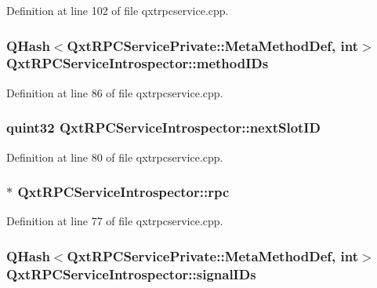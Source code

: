 Definition at line 102 of file qxtrpcservice.\-cpp.

\hypertarget{class_qxt_r_p_c_service_introspector_a5731d54f234700595b57a94949f50ba8}{
\subsubsection[{method\-I\-Ds}]{\setlength{\rightskip}{0pt plus 5cm}Q\-Hash$<${\bf Qxt\-R\-P\-C\-Service\-Private\-::\-Meta\-Method\-Def}, {\bf int}$>$ Qxt\-R\-P\-C\-Service\-Introspector\-::method\-I\-Ds}}\label{class_qxt_r_p_c_service_introspector_a5731d54f234700595b57a94949f50ba8}


Definition at line 86 of file qxtrpcservice.\-cpp.

\hypertarget{class_qxt_r_p_c_service_introspector_aa44ab8688af8058365bc75876c78fb22}{
\subsubsection[{next\-Slot\-I\-D}]{\setlength{\rightskip}{0pt plus 5cm}quint32 Qxt\-R\-P\-C\-Service\-Introspector\-::next\-Slot\-I\-D}}\label{class_qxt_r_p_c_service_introspector_aa44ab8688af8058365bc75876c78fb22}


Definition at line 80 of file qxtrpcservice.\-cpp.

\hypertarget{class_qxt_r_p_c_service_introspector_a6d63e9ebaf93049030c0f002cbb4b801}{
\subsubsection[{rpc}]{$\ast$ Qxt\-R\-P\-C\-Service\-Introspector\-::rpc}}\label{class_qxt_r_p_c_service_introspector_a6d63e9ebaf93049030c0f002cbb4b801}


Definition at line 77 of file qxtrpcservice.\-cpp.

\hypertarget{class_qxt_r_p_c_service_introspector_a74dedda40d244dab91af357016ea3ec8}{
\subsubsection[{signal\-I\-Ds}]{\setlength{\rightskip}{0pt plus 5cm}Q\-Hash$<${\bf Qxt\-R\-P\-C\-Service\-Private\-::\-Meta\-Method\-Def}, {\bf int}$>$ Qxt\-R\-P\-C\-Service\-Introspector\-::signal\-I\-Ds}}\label{class_qxt_r_p_c_service_introspector_a74dedda40d244dab91af357016ea3ec8}


